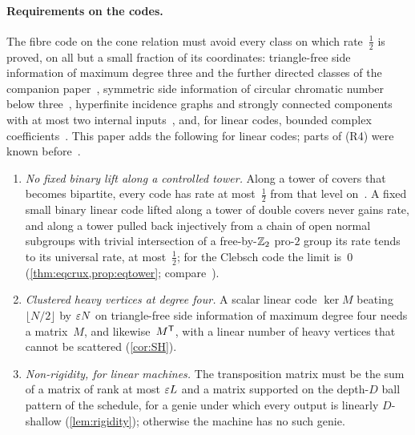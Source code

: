 \paragraph{Requirements on the codes.} The fibre code on the cone relation must avoid every class on which rate~$\frac12$ is
proved, on all but a small fraction of its coordinates: triangle-free side information of maximum degree three and the further
directed classes of the companion paper~\cite{SeventhPaper2026}, symmetric side information of circular chromatic number below
three~\cite[Corollary~3.2]{CircularMemo2026}, hyperfinite incidence graphs and strongly connected components with at most two
internal inputs~\cite[Corollary~4.4 and Theorem~5.1]{DirectedRecovery2026}, and, for linear codes, bounded complex
coefficients~\cite[Theorem~6.17]{FourthPaper2026}. This paper adds the following for linear codes; parts of (R4) were known
before~\cite{Covers2026}.
\begin{enumerate}[label=(R\arabic*),leftmargin=3em,resume]
\item \emph{No fixed binary lift along a controlled tower.} Along a tower of covers that becomes bipartite, every code has
rate at most~$\frac12$ from that level on~\cite[Corollary~6.9]{FourthPaper2026}. A fixed small binary linear code lifted along
a tower of double covers never gains rate, and along a tower pulled back injectively from a chain of open normal subgroups
with trivial intersection of a free-by-$\mathbb{Z}_2$ pro-$2$ group its rate tends to its universal rate, at most~$\frac12$; for the
Clebsch code the limit is~$0$ (\cref{thm:eqcrux,prop:eqtower}; compare~\cite[Lemma~9.1 and Theorem~6.2]{Covers2026}).
\item \emph{Clustered heavy vertices at degree four.} A scalar linear code $\ker M$ beating $\lfloor N/2\rfloor$ by $\varepsilon N$
on triangle-free side information of maximum degree four needs a matrix~$M$, and likewise~$M^{\mathsf{T}}$, with a linear number of heavy
vertices that cannot be scattered (\cref{cor:SH}).
\item \emph{Non-rigidity, for linear machines.} The transposition matrix must be the sum of a matrix of rank at most
$\varepsilon L$ and a matrix supported on the depth-$D$ ball pattern of the schedule, for a genie under which every output is linearly
$D$-shallow (\cref{lem:rigidity}); otherwise the machine has no such genie.
\end{enumerate}

